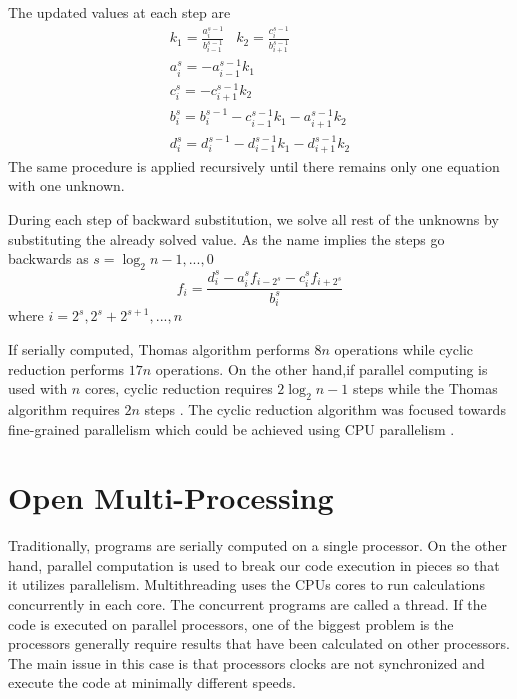 \documentclass[12pt, oneside]{book}
\theoremstyle{plain}
\theoremstyle{definition}
\begin{document}
The updated values at each step are  
\begin{eqnarray}
k_1 = \frac{ a_{i}^{s - 1}}{b_{i-1}^{s - 1}} \hspace{10pt} k_2 = \frac{ c_{i}^{s - 1}}{b_{i+1}^{s - 1}} \\
a_i^{s} = -a_{i-1}^{s - 1}  k_1\\
c_i^{s} = -c_{i+1}^{s - 1}  k_2\\
b_i^{s} = b_{i}^{s - 1} -c_{i-1}^{s - 1} k_1 - a_{i+1}^{s - 1}  k_2  \\
d_i^{s} = d_i^{s - 1} - d_{i- 1}^{s - 1}  k_1 - d_{i + 1}^{s - 1}   k_2
\end{eqnarray}
The same procedure is applied recursively until there remains only one equation with one unknown. 

During each step of backward substitution, we solve all rest of the unknowns by substituting the already solved value. As the name implies the steps go backwards as $s = \log_2 n - 1, ... , 0$
\begin{equation}
f_i = \frac{d_i^{s} - a_i^{s} f_{i - 2^s}  - c_i^{s} f_{i + 2^s}}{b_i^s}
\end{equation}
where  $ i = 2^s, 2^s + 2^{s+1}, ... , n$ 

If serially computed, Thomas algorithm performs $ 8 n $ operations while cyclic reduction performs $17n$ operations. On the other hand,if parallel computing is used with $n$ cores, cyclic reduction requires $2 \log_2 n - 1$ steps  while the Thomas algorithm requires $2n$ steps \cite{gputri}. The cyclic reduction algorithm was focused towards fine-grained parallelism which could be achieved using CPU parallelism \cite{seltri}.

\section{Open Multi-Processing}
Traditionally, programs are serially computed on a single processor. On the other hand, parallel computation is used to break our code execution in pieces so that it utilizes parallelism. Multithreading uses the CPUs cores to run calculations concurrently in each core. The concurrent programs are called a thread. If the code is executed on parallel processors, one of the biggest problem is the processors generally require results that have been calculated on other processors. The main issue in this case is that processors clocks are not synchronized and execute the code at minimally different speeds.
\end{document}
